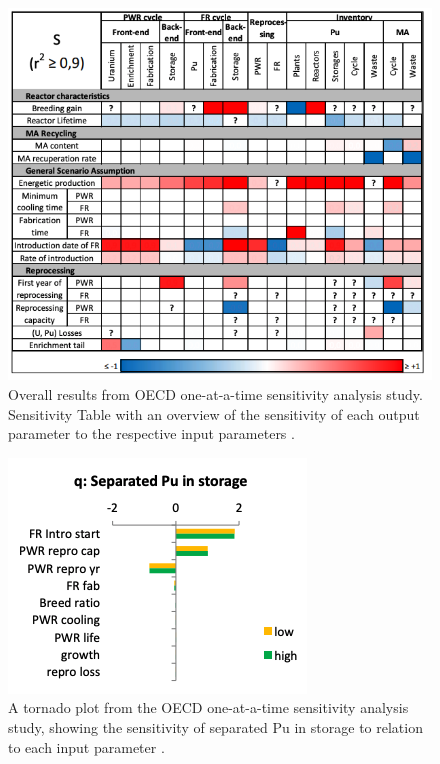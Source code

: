 \begin{figure}[]
	\begin{center}
		\includegraphics[scale=0.6]{./figures/oecd-sensitivitytable.png}
	\end{center}	
        \caption{Overall results from OECD one-at-a-time sensitivity analysis 
        study. Sensitivity Table with an overview of the sensitivity 
		of each output parameter to the respective input parameters \cite{noauthor_effects_2017}.}
	\label{fig:oecd-sensitivitytable}
\end{figure}

\begin{figure}[]
	\begin{center}
		\includegraphics[scale=0.75]{./figures/oecd-tornado.png}
	\end{center}	
		\caption{A tornado plot from the OECD one-at-a-time sensitivity analysis 
        study, showing the sensitivity of separated Pu in 
		storage to relation to each input parameter \cite{noauthor_effects_2017}.}
	\label{fig:oecd-tornado}
\end{figure}

